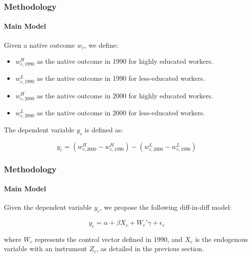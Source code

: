 
\begin{frame}
    \frametitle{Methodology}
    \framesubtitle{Main Model}

    Given a native outcome $w_c$, we define:
    \begin{itemize}
        \item $w_{c,1990}^H$ as the native outcome in 1990 for highly educated workers.
        \item $w_{c,1990}^L$ as the native outcome in 1990 for less-educated workers.
        \item $w_{c,2000}^H$ as the native outcome in 2000 for highly educated workers.
        \item $w_{c,2000}^L$ as the native outcome in 2000 for less-educated workers.
    \end{itemize}

The dependent variable $y_c$ is defined as:

\begin{equation}
    y_c = (w_{c,2000}^H - w_{c,1990}^H) - (w_{c,2000}^L - w_{c,1990}^L)
\end{equation}

\end{frame}


\begin{frame}
    \frametitle{Methodology}
    \framesubtitle{Main Model}

    Given the dependent variable $y_c$, we propose the following diff-in-diff model:

    \begin{equation}
        y_c = \alpha + \beta X_c + W_c' \gamma + \epsilon_c
    \end{equation}

    where $W_c$ represents the control vector defined in 1990, and $X_c$ is the endogenous variable with an instrument $Z_c$, as detailed in the previous section.

\end{frame}

